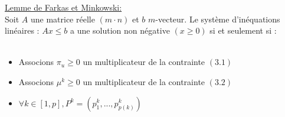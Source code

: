 \documentclass[t,10pt]{beamer}
\begin{document}
    \begin{frame}
        \underline{Lemme de Farkas et Minkowski:} \\
        Soit $A$ une matrice réelle $(m \cdot n)$ et $b$ $m$-vecteur.
        Le système d’inéquations linéaires : $Ax \le b$ a une solution non négative $(x \ge 0)$ si et seulement si : \\
        \vspace{0.2cm}
        \centering
        \\
        \vspace{1cm}
        \begin{itemize}
            \item Associons $\pi_{u} \ge 0$ un multiplicateur de la contrainte $(3.1)$
            \item Associons $\mu^{k} \ge 0$ un multiplicateur de la contrainte $(3.2)$
            \item $\forall k \in [1,p], P^{k} = (  p_{1}^{k},...,p_{p(k)}^{k})$
        \end{itemize}
    \end{frame}
\end{document}
